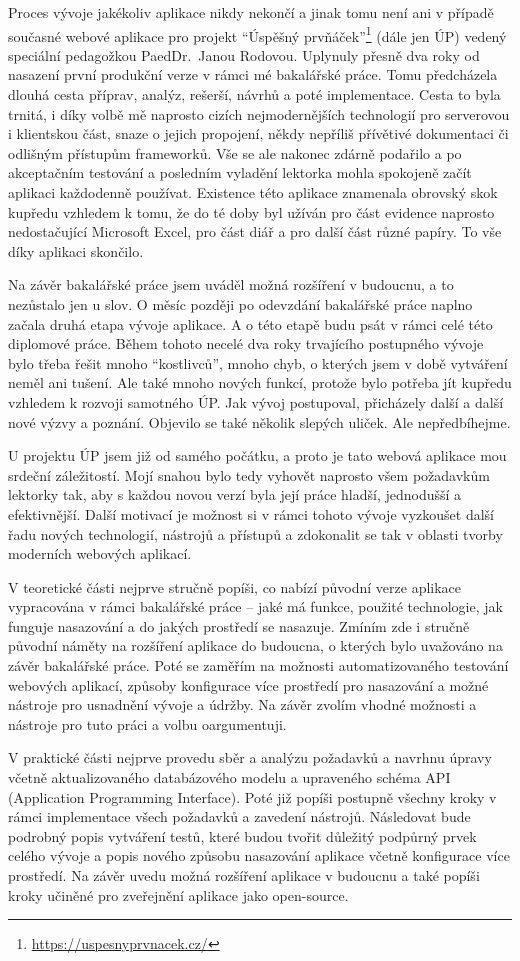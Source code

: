 Proces vývoje jakékoliv aplikace nikdy nekončí a jinak tomu není ani v případě současné webové aplikace pro projekt \enquote{Úspěšný prvňáček}\footnote{\url{https://uspesnyprvnacek.cz/}} (dále jen ÚP) vedený speciální pedagožkou PaedDr.~Janou Rodovou. Uplynuly přesně dva roky od nasazení první produkční verze v rámci mé bakalářské práce. Tomu předcházela dlouhá cesta příprav, analýz, rešerší, návrhů a poté implementace. Cesta to byla trnitá, i díky volbě mě naprosto cizích nejmodernějších technologií pro serverovou i klientskou část, snaze o jejich propojení, někdy nepříliš přívětivé dokumentaci či odlišným přístupům frameworků. Vše se ale nakonec zdárně podařilo a po akceptačním testování a posledním vyladění lektorka mohla spokojeně začít aplikaci každodenně používat. Existence této aplikace znamenala obrovský skok kupředu vzhledem k tomu, že do té doby byl užíván pro část evidence naprosto nedostačující Microsoft Excel, pro část diář a pro další část různé papíry. To vše díky aplikaci skončilo.

Na závěr bakalářské práce jsem uváděl možná rozšíření v budoucnu, a to nezůstalo jen u slov. O měsíc později po odevzdání bakalářské práce naplno začala druhá etapa vývoje aplikace. A o této etapě budu psát v rámci celé této diplomové práce. Během tohoto necelé dva roky trvajícího postupného vývoje bylo třeba řešit mnoho \enquote{kostlivců}, mnoho chyb, o kterých jsem v době vytváření neměl ani tušení. Ale také mnoho nových funkcí, protože bylo potřeba jít kupředu vzhledem k rozvoji samotného ÚP. Jak vývoj postupoval, přicházely další a další nové výzvy a poznání. Objevilo se také několik slepých uliček. Ale nepředbíhejme.

U projektu ÚP jsem již od samého počátku, a proto je tato webová aplikace mou srdeční záležitostí. Mojí snahou bylo tedy vyhovět naprosto všem požadavkům lektorky tak, aby s každou novou verzí byla její práce hladší, jednodušší a efektivnější. Další motivací je možnost si v rámci tohoto vývoje vyzkoušet další řadu nových technologií, nástrojů a přístupů a zdokonalit se tak v oblasti tvorby moderních webových aplikací.

V teoretické části nejprve stručně popíši, co nabízí původní verze aplikace vypracována v rámci bakalářské práce -- jaké má funkce, použité technologie, jak funguje nasazování a do jakých prostředí se nasazuje. Zmíním zde i stručně původní náměty na rozšíření aplikace do budoucna, o kterých bylo uvažováno na závěr bakalářské práce. Poté se zaměřím na možnosti automatizovaného testování webových aplikací, způsoby konfigurace více prostředí pro nasazování a možné nástroje pro usnadnění vývoje a údržby. Na závěr zvolím vhodné možnosti a nástroje pro tuto práci a volbu oargumentuji.

V praktické části nejprve provedu sběr a analýzu požadavků a navrhnu úpravy včetně aktualizovaného databázového modelu a upraveného schéma API (Application Programming Interface). Poté již popíši postupně všechny kroky v rámci implementace všech požadavků a zavedení nástrojů. Následovat bude podrobný popis vytváření testů, které budou tvořit důležitý podpůrný prvek celého vývoje a popis nového způsobu nasazování aplikace včetně konfigurace více prostředí. Na závěr uvedu možná rozšíření aplikace v budoucnu a také popíši kroky učiněné pro zveřejnění aplikace jako open-source.